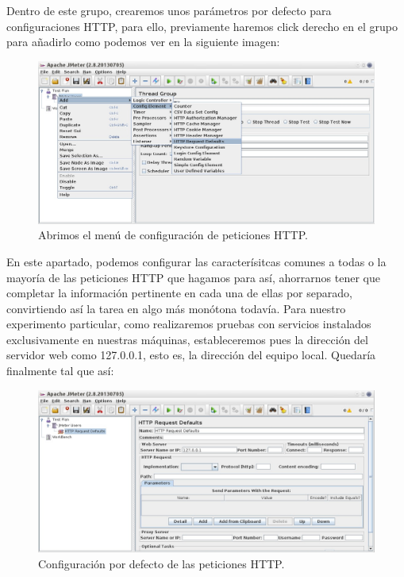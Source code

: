 \documentclass[paper=a4, fontsize=11pt]{scrartcl} %
\numberwithin{equation}{section} %
\numberwithin{figure}{section} %
\numberwithin{table}{section} %
\begin{document}
\begin{enumerate}
		Dentro de este grupo, crearemos unos parámetros por defecto para configuraciones HTTP, para
		ello, previamente haremos click derecho en el grupo para añadirlo como podemos ver en la
		siguiente imagen:
		
		\begin{figure}[H]
			\centering
			\includegraphics[width=15cm]{Ejercicio_7c.jpg}
			\caption{Abrimos el menú de configuración de peticiones HTTP.}
			\label{fig:http_menu}
		\end{figure}
		
		En este apartado, podemos configurar las caracterísitcas comunes a todas o la mayoría de las
		peticiones HTTP que hagamos para así, ahorrarnos tener que completar la información pertinente
		en cada una de ellas por separado, convirtiendo así la tarea en algo más monótona todavía. Para
		nuestro experimento particular, como realizaremos pruebas con servicios instalados exclusivamente
		en nuestras máquinas, estableceremos pues la dirección del servidor web como 127.0.0.1, esto es,
		la dirección del equipo local. Quedaría finalmente tal que así:
		
		\begin{figure}[H]
			\centering
			\includegraphics[width=15cm]{Ejercicio_7d.jpg}
			\caption{Configuración por defecto de las peticiones HTTP.}
			\label{fig:http_default}
		\end{figure}
		

\end{enumerate}
\end{document}
